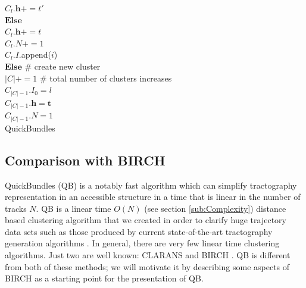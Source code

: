 \documentclass[preprint,authoryear,a4paper,10pt,onecolumn]{elsarticle}
\begin{document}
\begin{appendices}
\begin{algorithm}
\hspace*{4em} $C_{l}.\mathbf{h}+=t'$\\
\hspace*{2em} $\textbf{Else}$ \\
\hspace*{4em} $C_{l}.\mathbf{h}+=t$\\
\hspace*{2em} $C_{l}.N+=1$\\
\hspace*{2em} $C_{l}.I$.append($i$)\\
$\textbf{Else}$ \# create new cluster\\
\hspace*{2em} $|C|+=1$ \# total number of clusters increases\\
\hspace*{2em} $C_{|C|-1}.I_{0}=l$\\
\hspace*{2em} $C_{|C|-1}.\mathbf{h}=\mathbf{t}$\\
\hspace*{2em} $C_{|C|-1}.N=1$\\
\caption{QuickBundles}

\label{Alg:QuickBundles}
\end{algorithm}

\subsection{Comparison with BIRCH}

QuickBundles (QB) is a notably fast algorithm which can simplify
tractography representation in an accessible structure in a time that is
linear in the number of tracks $N$. QB is a linear time $O(N)$ (see
section \ref{sub:Complexity}) distance based clustering algorithm that
we created in order to clarify huge trajectory data sets such as those
produced by current state-of-the-art tractography generation algorithms
\citep{Parker2003,WWS+08}. In general, there are very few linear time
clustering algorithms. Just two are well known: CLARANS
\citep{ng2002clarans} and BIRCH \citep{zhang1997birch}. QB is different
from both of these methods; we will motivate it by describing some
aspects of BIRCH as a starting point for the presentation of QB.


\end{appendices}
\end{document}
